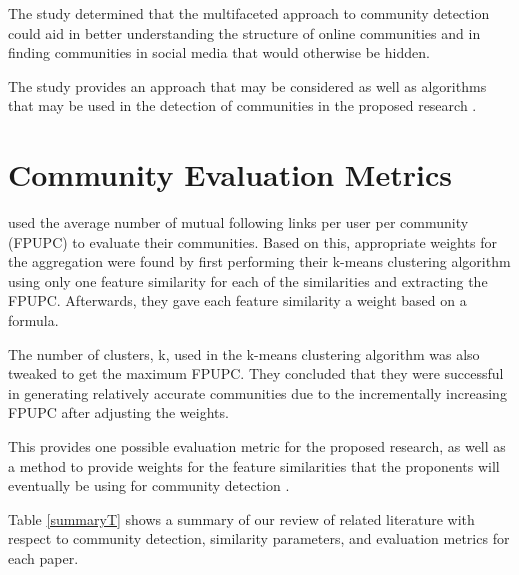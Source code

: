 The study determined that the multifaceted approach to community detection could aid in better understanding the structure of online communities and in finding communities in social media that would otherwise be hidden.

The study provides an approach that may be considered as well as algorithms that may be used in the detection of communities in the proposed research \cite{Darmon:2015}.

\section{Community Evaluation Metrics}

 used the average number of mutual following links per user per community (FPUPC) to evaluate their communities. Based on this, appropriate weights for the aggregation were found by first performing their k-means clustering algorithm using only one feature similarity for each of the similarities and extracting the FPUPC. Afterwards, they gave each feature similarity a weight based on a formula. 

The number of clusters, k, used in the k-means clustering algorithm was also tweaked to get the maximum FPUPC. They concluded that they were successful in generating relatively accurate communities due to the incrementally increasing FPUPC after adjusting the weights.

This provides one possible evaluation metric for the proposed research, as well as a method to provide weights for the feature similarities that the proponents will eventually be using for community detection \cite{Zhang:2012}.

\newpage
Table \ref{summaryT} shows a summary of our review of related literature with respect to community detection, similarity parameters, and evaluation metrics for each paper.

